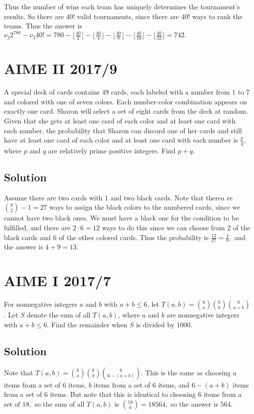 \documentclass{article}
\begin{document}
Thus the number of wins each team has uniquely determines the tournament's results. So there are $40!$ valid tournaments, since there are $40!$ ways to rank the teams. Thus the answer is $\nu_2{2^780}-\nu_2{40!}=780-\lfloor\frac{40}{2}\rfloor-\lfloor\frac{40}{4}\rfloor-\lfloor\frac{40}{8}\rfloor-\lfloor\frac{40}{16}\rfloor-\lfloor\frac{40}{32}\rfloor=742.$

\pagebreak\section{AIME II 2017/9}{A special deck of cards contains $49$ cards, each labeled with a number from $1$ to $7$ and colored with one of seven colors. Each number-color combination appears on exactly one card. Sharon will select a set of eight cards from the deck at random. Given that she gets at least one card of each color and at least one card with each number, the probability that Sharon can discard one of her cards and still have at least one card of each color and at least one card with each number is $\frac{p}{q}$, where $p$ and $q$ are relatively prime positive integers. Find $p+q$.}
\subsection{Solution}
Assume there are two cards with $1$ and two black cards. Note that therea re $\binom{8}{2}-1=27$ ways to assign the black colors to the numbered cards, since we cannot have two black ones. We must have a black one for the condition to be fulfilled, and there are $2\cdot 6=12$ ways to do this since we can choose from $2$ of the black cards and $6$ of the other colored cards. Thus the probability is $\frac{12}{27}=\frac{4}{9},$ and the answer is $4+9=13.$





\pagebreak\section{AIME I 2017/7}{For nonnegative integers $a$ and $b$ with $a + b \leq 6$, let $T(a, b) = \binom{6}{a} \binom{6}{b} \binom{6}{a + b}$. Let $S$ denote the sum of all $T(a, b)$, where $a$ and $b$ are nonnegative integers with $a + b \leq 6$. Find the remainder when $S$ is divided by $1000$.}
\subsection{Solution}
Note that $T(a,b)=\binom{6}{a}\binom{6}{b}\binom{6}{6-(a+b)}.$ This is the same as choosing $a$ items from a set of $6$ items, $b$ items from a set of $6$ items, and $6-(a+b)$ items from a set of $6$ items. But note that this is identical to choosing $6$ items from a set of $18,$ so the sum of all $T(a,b)$ is $\binom{18}{6}=18564,$ so the answer is $564.$
\end{document}
